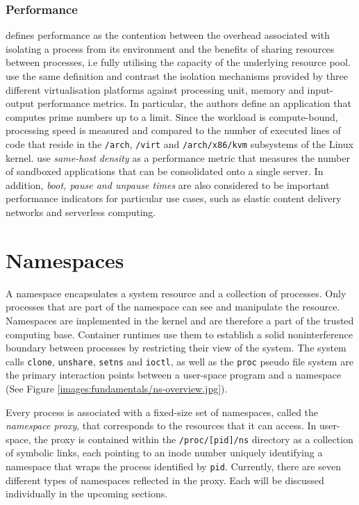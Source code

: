 \subsubsection{Performance}
\label{sections:fundamentals/virtualisation/axioms/performance}
\textcite{10.1145/3365199} defines performance as the contention between the overhead associated 
with isolating a process from its environment and the benefits of sharing resources between processes,
i.e fully utilising the capacity of the underlying resource pool. 
\textcite{10.1145/3381052.3381315} use the same definition and contrast the isolation mechanisms provided
by three different virtualisation platforms against processing unit, memory and input-output performance metrics. 
In particular, the authors define an application that computes prime numbers up to a limit. 
Since the workload is compute-bound, processing speed is measured and compared to the
number of executed lines of code that reside in the \verb|/arch|, \verb|/virt| and \verb|/arch/x86/kvm|
subsystems of the Linux kernel. \textcite{10.1145/3132747.3132763} use \textit{same-host density} as a 
performance metric that measures the number of sandboxed applications that can be consolidated onto a single server.
In addition, \textit{boot, pause and unpause times} are also considered to be important performance indicators for particular 
use cases, such as elastic content delivery networks \cite{10.1145/3050748.3050757} \cite{10.1145/3132747.3132763}
and serverless computing.

\section{Namespaces}
\label{sections:fundamentals/namespaces}
A namespace encapsulates a system resource and a collection of processes. Only processes that are 
part of the namespace can see and manipulate the resource. Namespaces are implemented in the 
kernel and are therefore a part of the trusted computing base. Container runtimes use them 
to establish a solid noninterference boundary between processes by restricting their view of the system. 
The system calls \verb|clone|, \verb|unshare|, \verb|setns| and \verb|ioctl|, as well as the 
\verb|proc| pseudo file system are the primary interaction points between a user-space program and a namespace (See Figure \ref{images:fundamentals/ns-overview.jpg}).

Every process is associated with a fixed-size set of namespaces, called the \textit{namespace proxy}, that corresponds to the
resources that it can access.
In user-space, the proxy is contained within the \verb|/proc/[pid]/ns| directory as a 
collection of symbolic links, each pointing to an inode number uniquely identifying a namespace 
that wraps the process identified by \verb|pid|. Currently, there are seven different types 
of namespaces reflected in the proxy. Each will be discussed individually in the upcoming sections. 

